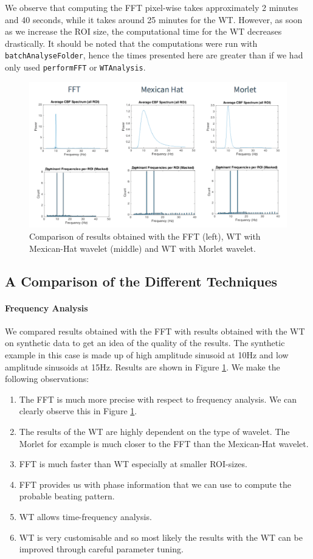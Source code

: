 \documentclass[11pt]{scrartcl}
\begin{document}
We observe that computing the FFT pixel-wise takes approximately 2 minutes and 40 seconds, while it takes around 25 
minutes for the WT. However, as soon as we increase the ROI size, the computational time for the WT decreases
drastically. It should be noted that the computations were run with \texttt{batchAnalyseFolder}, hence the
times presented here are greater than if we had only used \texttt{performFFT} or \texttt{WTAnalysis}.

\begin{figure}[h]
  \centering
  \includegraphics[width=0.8\linewidth]{compare}
  \caption{Comparison of results obtained with the FFT (left), WT with Mexican-Hat wavelet (middle) and WT with Morlet wavelet. }
  \label{fig:compare}
\end{figure}


\subsection{A Comparison of the Different Techniques}
\label{sec:comp-techn-used}

\paragraph{Frequency Analysis}

We compared results obtained with the FFT with results obtained with the WT on synthetic data to get an idea of the quality of the results. The synthetic example in this case is made up of high amplitude sinusoid at 10Hz and low amplitude sinusoids at 15Hz. Results are shown in Figure \ref{fig:compare}. We make the following observations:

\begin{enumerate}
\item The FFT is much more precise with respect to frequency analysis. We can clearly observe this in Figure \ref{fig:compare}. 
\item The results of the WT are highly dependent on the type of wavelet. The Morlet for example is much closer to the FFT than the Mexican-Hat wavelet.
\item FFT is much faster than WT especially at smaller ROI-sizes.
\item FFT provides us with phase information that we can use to compute the probable beating pattern.
\item WT allows time-frequency analysis.
\item WT is very customisable and so most likely the results with the WT can be improved through careful parameter tuning.
\end{enumerate}
\end{document}
